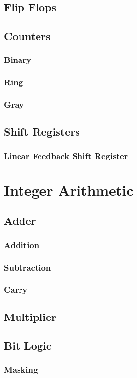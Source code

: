 \documentclass[a4paper,11pt]{book}
\begin{document}
\section{Flip Flops}
\section{Counters}
\subsection{Binary}
\subsection{Ring}
\subsection{Gray}
\section{Shift Registers}
\subsection{Linear Feedback Shift Register}

\chapter{Integer Arithmetic}
\section{Adder}
\subsection{Addition}
\subsection{Subtraction}
\subsection{Carry}
\section{Multiplier}
\section{Bit Logic}
\subsection{Masking}
\end{document}

